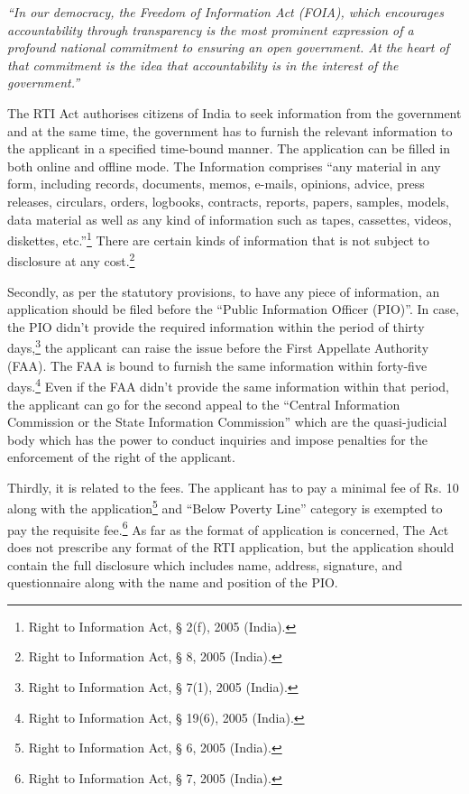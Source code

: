 \begin{multicols}{2}
\noi
\begin{quoting}
\textit{“In our democracy, the Freedom of Information Act (FOIA), which encourages
accountability through transparency is the most prominent expression of a profound
national commitment to ensuring an open government. At the heart of that
commitment is the idea that accountability is in the interest of the government.”}
\end{quoting}

\noi
The RTI Act authorises citizens of India to seek information from the government and at the
same time, the government has to furnish the relevant information to the applicant in a
specified time-bound manner. The application can be filled in both online and offline mode.
The Information comprises “any material in any form, including records, documents, memos,
e-mails, opinions, advice, press releases, circulars, orders, logbooks, contracts, reports,
papers, samples, models, data material as well as any kind of information such as tapes,
cassettes, videos, diskettes, etc.”\footnote{Right to Information Act, § 2(f), 2005 (India).} 
 There are certain kinds of information that is not subject to
disclosure at any cost.\footnote{Right to Information Act, § 8, 2005 (India).}

\noi
Secondly, as per the statutory provisions, to have any piece of information, an application
should be filed before the “Public Information Officer (PIO)”. In case, the PIO didn’t provide
the required information within the period of thirty days,\footnote{Right to Information Act, § 7(1), 2005 (India).} 
 the applicant can raise the issue before the First Appellate Authority (FAA). The FAA is bound to furnish the same
information within forty-five days.\footnote{Right to Information Act, § 19(6), 2005 (India).} Even if the FAA didn’t provide the same information
within that period, the applicant can go for the second appeal to the “Central Information
Commission or the State Information Commission” which are the quasi-judicial body which
has the power to conduct inquiries and impose penalties for the enforcement of the right of
the applicant.

\noi
Thirdly, it is related to the fees. The applicant has to pay a minimal fee of Rs. 10 along with
the application\footnote{Right to Information Act, § 6, 2005 (India).} and “Below Poverty Line” category is exempted to pay the requisite fee.\footnote{Right to Information Act, § 7, 2005 (India).} As
far as the format of application is concerned, The Act does not prescribe any format of the
RTI application, but the application should contain the full disclosure which includes name,
address, signature, and questionnaire along with the name and position of the PIO.


\end{multicols}
